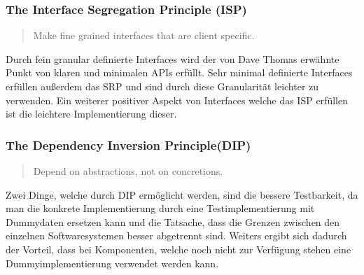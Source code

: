 \subsubsection{The Interface Segregation Principle (ISP)}
\begin{quotation}
	Make fine grained interfaces that are client specific.
\end{quotation}

Durch fein granular definierte Interfaces wird der von Dave Thomas erwähnte Punkt von klaren und minimalen APIs erfüllt. Sehr minimal definierte Interfaces erfüllen außerdem das SRP und sind durch diese Granularität leichter zu verwenden. Ein weiterer positiver Aspekt von Interfaces welche das ISP erfüllen ist die leichtere Implementierung dieser.

\subsubsection{The Dependency Inversion Principle(DIP)}
\begin{quotation}
	Depend on abstractions, not on concretions.
\end{quotation}

Zwei Dinge, welche durch DIP ermöglicht werden, sind die bessere Testbarkeit, da man die konkrete Implementierung durch eine Testimplementierung mit Dummydaten ersetzen kann und die Tatsache, dass die Grenzen zwischen den einzelnen Softwaresystemen besser abgetrennt sind. Weiters ergibt sich dadurch der Vorteil, dass bei Komponenten, welche noch nicht zur Verfügung stehen eine Dummyimplementierung verwendet werden kann. 